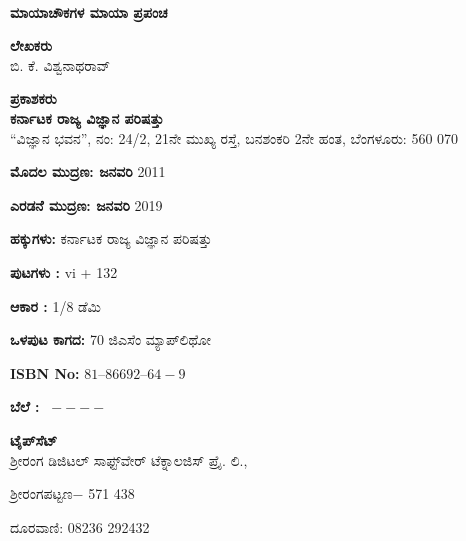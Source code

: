 ~
\thispagestyle{empty}

\vfill

\begin{center}
{\Large\bfseries ಮಾಯಾಚೌಕಗಳ ಮಾಯಾ ಪ್ರಪಂಚ}\\

\smallskip
\smallskip
\smallskip

{\bfseries ಲೇಖಕರು}\\[0.1cm]
ಬಿ. ಕೆ. ವಿಶ್ವನಾಥರಾವ್\\


\vfill

\smallskip

{\bfseries ಪ್ರಕಾಶಕರು}\\[0.1cm]
{\large\bfseries ಕರ್ನಾಟಕ ರಾಜ್ಯ ವಿಜ್ಞಾನ ಪರಿಷತ್ತು}\\
“ವಿಜ್ಞಾನ ಭವನ”, ನಂ: {\rm 24/2}, {\rm 21}ನೇ ಮುಖ್ಯ ರಸ್ತೆ, ಬನಶಂಕರಿ {\rm 2}ನೇ ಹಂತ, ಬೆಂಗಳೂರು: {\rm 560 070}
\end{center}

\vfill

\begin{center}
{\bfseries ಮೊದಲ ಮುದ್ರಣ: ಜನವರಿ} {\rm 2011}

\vfill

{\bfseries ಎರಡನೆ ಮುದ್ರಣ: ಜನವರಿ} {\rm 2019}

\vfill

{\bfseries ಹಕ್ಕುಗಳು:} ಕರ್ನಾಟಕ ರಾಜ್ಯ ವಿಜ್ಞಾನ ಪರಿಷತ್ತು 

\vfill

{\bfseries ಪುಟಗಳು :} vi + 132

\vfill

{\bfseries ಆಕಾರ : } {\rm 1/8 ಡೆಮಿ}

\vfill

{\bfseries ಒಳಪುಟ ಕಾಗದ:} {\rm 70} ಜಿಎಸೆಂ ಮ್ಯಾಪ್‌ಲಿಥೋ 

\vfill

 {\rm {\bfseries ISBN No:}} {\rm $81–86692–64-9$}

\vfill


{\bfseries ಬೆಲೆ :} \rupee \ {\rm $----$}

\vfill

{\bfseries ಟೈಪ್‌ಸೆಟ್}\\
 ಶ್ರೀರಂಗ ಡಿಜಿಟಲ್ ಸಾಫ್ಟ್‌ವೇರ್ ಟೆಕ್ನಾಲಜಿಸ್ ಪ್ರೈ. ಲಿ.,

ಶ್ರೀರಂಗಪಟ್ಟಣ$-$ {\rm 571 438}

\smallskip

ದೂರವಾಣಿ: {\rm 08236 292432}

\vfill

\end{center}
\newpage

